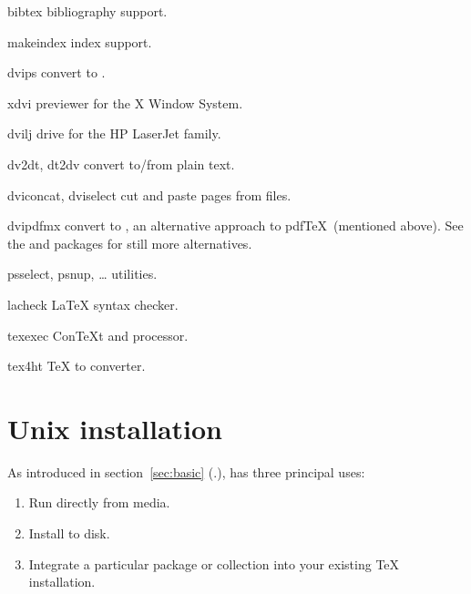\documentclass{article}
\begin{document}
\begin{cmddescription}

\item [bibtex] bibliography support.

\item [makeindex] index support.

\item [dvips] convert \dvi{} to \PS{}.

\item [xdvi] \dvi{} previewer for the X Window System.

\item [dvilj] \dvi{} drive for the HP LaserJet family.

\item [dv2dt, dt2dv] convert \dvi{} to/from plain text.

\item [dviconcat, dviselect] cut and paste pages
from \dvi{} files.

\item [dvipdfmx] convert \dvi{} to , an alternative approach
to pdf\TeX\ (mentioned above).  See the  and
 packages for still more alternatives.

\item [psselect, psnup, \ldots] \PS{}
utilities.

\item [lacheck] \LaTeX{} syntax checker.

\item [texexec] Con\TeX{}t and  processor.

\item [tex4ht] \TeX{} to  converter.  

\end{cmddescription}


\section{Unix installation}
\label{sec:unix-install}

As introduced in section~\ref{sec:basic} (\p.\pageref{sec:basic}),
\TL{} has three principal uses:

\begin{enumerate}
\item Run directly from media.
\item Install to disk.
\item Integrate a particular package or collection into your existing
\TeX{} installation.
\end{enumerate}
\end{document}
